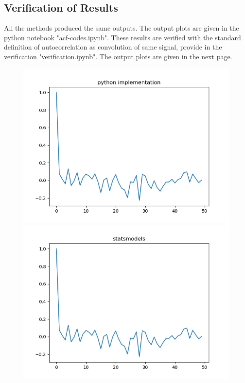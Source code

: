 \documentclass[10pt, onecolumn]{article}
\begin{document}
\begin{enumerate}
\subsection{Verification of Results}
All the methods produced the same outputs. The output plots are given in the python notebook "acf-codes.ipynb". These results are verified with the standard definition of autocorrelation as convolution of same signal, provide in the verification "verification.ipynb". 
		The output plots are given in the next page.

		\begin{figure}[h!]
\centering
\begin{minipage}{.5\textwidth}
  \centering
  \includegraphics[scale=0.5]{figs/python_imp.png}
	\caption{}
\label{fig:python_imp}
\end{minipage}%
\begin{minipage}{.5\textwidth}
  \centering
  \includegraphics[scale=0.5]{figs/statsmodels.png}
	\caption{}
\end{minipage}
\end{figure}


\end{enumerate}
\end{document}
